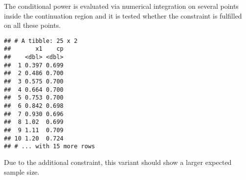 \documentclass[
]{book}
\newenvironment{Shaded}{\begin{snugshade}}{\end{snugshade}}
\newcommand{\AttributeTok}[1]{\textcolor[rgb]{0.77,0.63,0.00}{#1}}
\newcommand{\DecValTok}[1]{\textcolor[rgb]{0.00,0.00,0.81}{#1}}
\newcommand{\FloatTok}[1]{\textcolor[rgb]{0.00,0.00,0.81}{#1}}
\newcommand{\FunctionTok}[1]{\textcolor[rgb]{0.00,0.00,0.00}{#1}}
\newcommand{\NormalTok}[1]{#1}
\newcommand{\SpecialCharTok}[1]{\textcolor[rgb]{0.00,0.00,0.00}{#1}}
\newcommand{\StringTok}[1]{\textcolor[rgb]{0.31,0.60,0.02}{#1}}
\begin{document}
The conditional power is evaluated via numerical integration on several points inside the continuation region and it is tested whether the constraint is fulfilled on all these points.

\begin{Shaded}
\end{Shaded}

\begin{verbatim}
## # A tibble: 25 x 2
##       x1    cp
##    <dbl> <dbl>
##  1 0.397 0.699
##  2 0.486 0.700
##  3 0.575 0.700
##  4 0.664 0.700
##  5 0.753 0.700
##  6 0.842 0.698
##  7 0.930 0.696
##  8 1.02  0.699
##  9 1.11  0.709
## 10 1.20  0.724
## # ... with 15 more rows
\end{verbatim}

Due to the additional constraint, this variant should show a larger expected sample size.

\begin{Shaded}
\end{Shaded}
\end{document}
